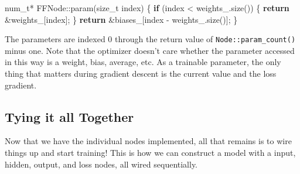 \documentclass[
]{article}
\newenvironment{Shaded}{}{}
\newcommand{\ControlFlowTok}[1]{\textcolor[rgb]{0.00,0.44,0.13}{\textbf{#1}}}
\newcommand{\DataTypeTok}[1]{\textcolor[rgb]{0.56,0.13,0.00}{#1}}
\newcommand{\NormalTok}[1]{#1}
\newcommand{\VariableTok}[1]{\textcolor[rgb]{0.10,0.09,0.49}{#1}}
\begin{document}
\begin{Shaded}
\begin{Highlighting}[]
\DataTypeTok{num\_t}\NormalTok{* FFNode::param(}\DataTypeTok{size\_t}\NormalTok{ index)}
\NormalTok{\{}
    \ControlFlowTok{if}\NormalTok{ (index \textless{} }\VariableTok{weights\_}\NormalTok{.size())}
\NormalTok{    \{}
        \ControlFlowTok{return}\NormalTok{ \&}\VariableTok{weights\_}\NormalTok{[index];}
\NormalTok{    \}}
    \ControlFlowTok{return}\NormalTok{ \&}\VariableTok{biases\_}\NormalTok{[index {-} }\VariableTok{weights\_}\NormalTok{.size()];}
\NormalTok{\}}
\end{Highlighting}
\end{Shaded}

The parameters are indexed 0 through the return value of
\texttt{Node::param\_count()} minus one. Note that the optimizer doesn't
care whether the parameter accessed in this way is a weight, bias,
average, etc. As a trainable parameter, the only thing that matters
during gradient descent is the current value and the loss gradient.

\hypertarget{tying-it-all-together}{%
\subsection{Tying it all Together}\label{tying-it-all-together}}

Now that we have the individual nodes implemented, all that remains is
to wire things up and start training! This is how we can construct a
model with a input, hidden, output, and loss nodes, all wired
sequentially.
\end{document}
